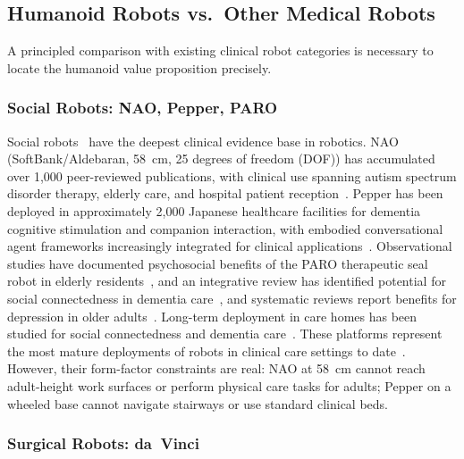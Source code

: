 \subsection{Humanoid Robots vs.\ Other Medical Robots}
\label{sec:alternatives}

A principled comparison with existing clinical robot categories is necessary to
locate the humanoid value proposition precisely.

\subsubsection{Social Robots: NAO, Pepper, PARO}

Social robots~\cite{fong2003survey,dautenhahn2007socially} have the deepest
clinical evidence base in robotics. NAO
(SoftBank/Aldebaran, 58~cm, 25 degrees of freedom (DOF)) has accumulated over
1,000 peer-reviewed
publications, with clinical use spanning autism spectrum disorder therapy,
elderly care, and hospital patient reception~\cite{cabibihan2013robots}. Pepper
has been deployed in approximately 2,000 Japanese healthcare facilities for
dementia cognitive stimulation and companion interaction, with embodied
conversational agent frameworks increasingly integrated for clinical
applications~\cite{provoost2017embodied,sorensen2025humanoid,cunha2025humanoid}.
Observational studies have documented psychosocial benefits of the PARO therapeutic
seal robot in elderly residents~\cite{wada2007living}, and an integrative review
has identified potential for social connectedness in dementia
care~\cite{moyle2017telepresence}, and systematic reviews report benefits for
depression in older adults~\cite{chen2018social}. Long-term deployment in care homes has been
studied for social connectedness and dementia care~\cite{moyle2014dementia}.
These platforms represent the most mature deployments of robots in clinical care
settings to date~\cite{abdi2018scoping}. However, their form-factor constraints are real: NAO at 58~cm cannot
reach adult-height work surfaces or perform physical care tasks for adults; Pepper
on a wheeled base cannot navigate stairways or use standard clinical beds.

\subsubsection{Surgical Robots: da~Vinci}

